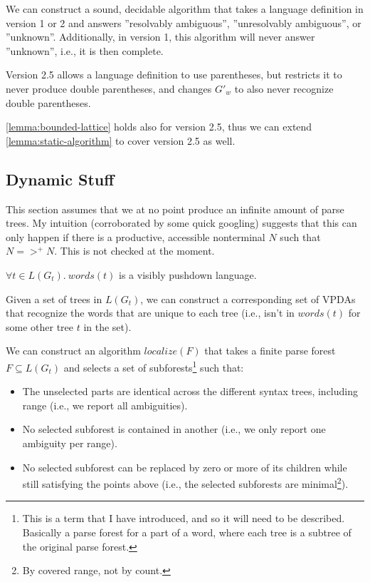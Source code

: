 \documentclass[acmsmall,review,anonymous]{acmart}\settopmatter{printfolios=true,printccs=false,printacmref=false}
\newcommand{\words}{\mathit{words}} %
\newcommand{\localize}{\mathit{localize}} %
\begin{document}
\begin{theorem}
We can construct a sound, decidable algorithm that takes a language definition in version 1 or 2 and answers ''resolvably ambiguous'', ''unresolvably ambiguous'', or ''unknown''. Additionally, in version 1, this algorithm will never answer ''unknown'', i.e., it is then complete.
\label{lemma:static-algorithm}
\end{theorem}

\begin{definition}
Version 2.5 allows a language definition to use parentheses, but restricts it to never produce double parentheses, and changes $G'_w$ to also never recognize double parentheses.
\end{definition}

\begin{theorem}
\ref{lemma:bounded-lattice} holds also for version 2.5, thus we can extend \ref{lemma:static-algorithm} to cover version 2.5 as well.
\end{theorem}

\subsection{Dynamic Stuff}

This section assumes that we at no point produce an infinite amount of parse trees. My intuition (corroborated by some quick googling) suggests that this can only happen if there is a productive, accessible nonterminal $N$ such that $N =>^{+} N$. This is not checked at the moment.

\begin{lemma}
$\forall t \in L(G_t).\ \words(t)$ is a visibly pushdown language.
\end{lemma}

\begin{theorem}
  Given a set of trees in $L(G_t)$, we can construct a corresponding set of VPDAs that recognize the words that are unique to each tree (i.e., isn't in $\words(t)$ for some other tree $t$ in the set).
\end{theorem}

\begin{theorem}
  We can construct an algorithm $\localize(F)$ that takes a finite parse forest $F \subseteq L(G_t)$ and selects a set of subforests\footnote{This is a term that I have introduced, and so it will need to be described. Basically a parse forest for a part of a word, where each tree is a subtree of the original parse forest.} such that:
  \begin{itemize}
  \item The unselected parts are identical across the different syntax trees, including range (i.e., we report all ambiguities).
  \item No selected subforest is contained in another (i.e., we only report one ambiguity per range).
  \item No selected subforest can be replaced by zero or more of its children while still satisfying the points above (i.e., the selected subforests are minimal\footnote{By covered range, not by count.}).
  \end{itemize}
\end{theorem}
\end{document}
